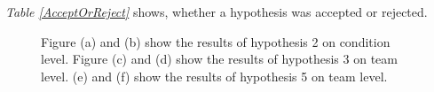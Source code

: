 \documentclass[sigchi]{acmart}
\begin{document}
\textit{Table \ref{AcceptOrReject}} shows, whether a hypothesis was accepted or rejected.


\begin{figure}[H]
  \centering
  \qquad
  \qquad
  \qquad
  \qquad
  \qquad
  \qquad
  \caption[Results of hypothesis 2, 3 and 5]{Figure (a) and (b) show the results of hypothesis 2 on condition level. Figure (c) and (d) show the results of hypothesis 3 on team level. (e) and (f) show the results of hypothesis 5 on team level.}
  \label{H2H3H5}
\end{figure}
\end{document}
